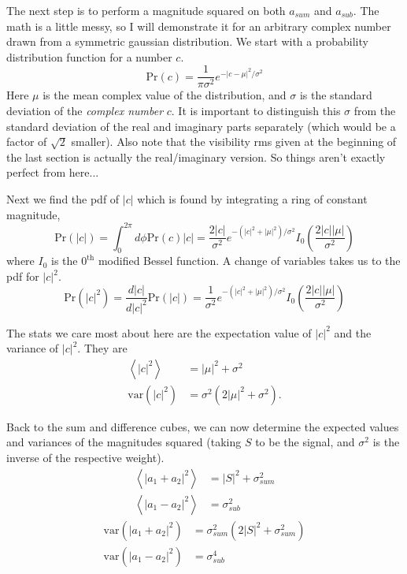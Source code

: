 \documentclass{article}
\begin{document}
The next step is to perform a magnitude squared on both $a_{sum}$ and $a_{sub}$. The math is a little messy, so I will demonstrate it for an arbitrary complex number drawn from a symmetric gaussian distribution. We start with a probability distribution function for a number $c$.
\begin{equation}
\mathrm{Pr}(c) = \frac{1}{\pi \sigma^2} e^{-\left|c-\mu\right|^2/\sigma^2}
\end{equation}
Here $\mu$ is the mean complex value of the distribution, and $\sigma$ is the standard deviation of the \emph{complex number} $c$. It is important to distinguish this $\sigma$ from the standard deviation of the real and imaginary parts separately (which would be a factor of $\sqrt{2}$ smaller). Also note that the visibility rms given at the beginning of the last section is actually the real/imaginary version. So things aren't exactly perfect from here...

Next we find the pdf of $|c|$ which is found by integrating a ring of constant magnitude,
\begin{equation}
\mathrm{Pr}(|c|) = \int_0^{2\pi}d\phi \mathrm{Pr}(c)|c| = \frac{2 |c|}{\sigma^2} e^{-(|c|^2+|\mu|^2)/\sigma^2} I_0(\frac{2|c||\mu|}{\sigma^2})
\end{equation}
where $I_0$ is the $0^{\mathrm{th}}$ modified Bessel function. A change of variables takes us to the pdf for $|c|^2$.
\begin{equation}
\mathrm{Pr}(|c|^2) = \frac{d |c|}{d |c|^2} \mathrm{Pr}(|c|) = \frac{1}{\sigma^2} e^{-(|c|^2+|\mu|^2)/\sigma^2} I_0(\frac{2|c||\mu|}{\sigma^2})
\end{equation}

The stats we care most about here are the expectation value of $|c|^2$ and the variance of $|c|^2$. They are
\begin{subequations}
\begin{align}
\left< |c|^2 \right> & = |\mu|^2 + \sigma^2\\
\mathrm{var}(|c|^2) & = \sigma^2\left(2 |\mu|^2 + \sigma^2\right).
\end{align}
\end{subequations}

Back to the sum and difference cubes, we can now determine the expected values and variances of the magnitudes squared (taking $S$ to be the signal, and $\sigma^2$ is the inverse of the respective weight).
\begin{subequations}
\begin{align}
\left<\left|a_1+a_2\right|^2\right> & = |S|^2 + \sigma_{sum}^2 \\
\left<\left|a_1-a_2\right|^2\right> & = \sigma_{sub}^2
\end{align}
\end{subequations}
\begin{subequations}
\begin{align}
\mathrm{var}\left(\left|a_1+a_2\right|^2\right) & = \sigma_{sum}^2 \left(2 |S|^2 + \sigma_{sum}^2\right) \\
\mathrm{var}\left(\left|a_1-a_2\right|^2\right) & = \sigma_{sub}^4
\end{align}
\end{subequations}
\end{document}
